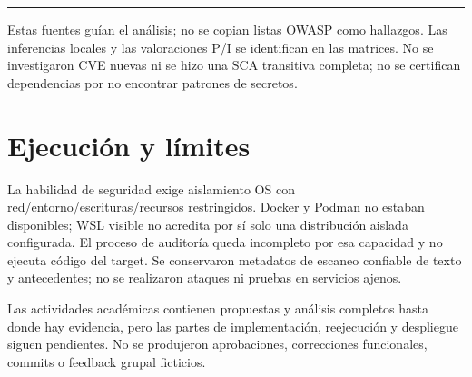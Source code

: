 \documentclass[12pt,a4paper]{report}
\begin{document}
\medskip\hrule\medskip

Estas fuentes guían el análisis; no se copian listas OWASP como
hallazgos. Las inferencias locales y las valoraciones P/I se identifican
en las matrices. No se investigaron CVE nuevas ni se hizo una SCA
transitiva completa; no se certifican dependencias por no encontrar
patrones de secretos.

\section{Ejecución y
límites}\label{ACD4-semana-4-anexo2-ejecuciuxf3n-y-luxedmites}

La habilidad de seguridad exige aislamiento OS con
red/entorno/escrituras/recursos restringidos. Docker y Podman no estaban
disponibles; WSL visible no acredita por sí solo una distribución
aislada configurada. El proceso de auditoría queda incompleto por esa
capacidad y no ejecuta código del target. Se conservaron metadatos de
escaneo confiable de texto y antecedentes; no se realizaron ataques ni
pruebas en servicios ajenos.

Las actividades académicas contienen propuestas y análisis completos
hasta donde hay evidencia, pero las partes de implementación,
reejecución y despliegue siguen pendientes. No se produjeron
aprobaciones, correcciones funcionales, commits o feedback grupal
ficticios.


\end{document}
